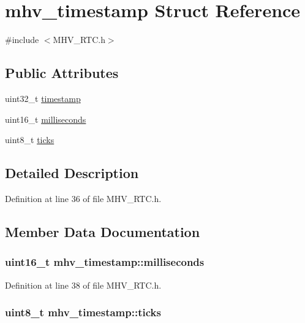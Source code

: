 \hypertarget{structmhv__timestamp}{
\section{mhv\-\_\-timestamp \-Struct \-Reference}
\label{structmhv__timestamp}
}


{\ttfamily \#include $<$\-M\-H\-V\-\_\-\-R\-T\-C.\-h$>$}

\subsection*{\-Public \-Attributes}
\begin{DoxyCompactItemize}
\item 
uint32\-\_\-t \hyperlink{structmhv__timestamp_a0f520358e057865fb12a9153cae820c5}{timestamp}
\item 
uint16\-\_\-t \hyperlink{structmhv__timestamp_a8285e4adf91b7ddbec8ab65b5ab855e1}{milliseconds}
\item 
uint8\-\_\-t \hyperlink{structmhv__timestamp_a9580508b8bfb37df0713ad6b4ad58636}{ticks}
\end{DoxyCompactItemize}


\subsection{\-Detailed \-Description}


\-Definition at line 36 of file \-M\-H\-V\-\_\-\-R\-T\-C.\-h.



\subsection{\-Member \-Data \-Documentation}
\hypertarget{structmhv__timestamp_a8285e4adf91b7ddbec8ab65b5ab855e1}{
\subsubsection[{milliseconds}]{\setlength{\rightskip}{0pt plus 5cm}uint16\-\_\-t {\bf mhv\-\_\-timestamp\-::milliseconds}}}
\label{structmhv__timestamp_a8285e4adf91b7ddbec8ab65b5ab855e1}


\-Definition at line 38 of file \-M\-H\-V\-\_\-\-R\-T\-C.\-h.

\hypertarget{structmhv__timestamp_a9580508b8bfb37df0713ad6b4ad58636}{
\subsubsection[{ticks}]{\setlength{\rightskip}{0pt plus 5cm}uint8\-\_\-t {\bf mhv\-\_\-timestamp\-::ticks}}}
\label{structmhv__timestamp_a9580508b8bfb37df0713ad6b4ad58636}


